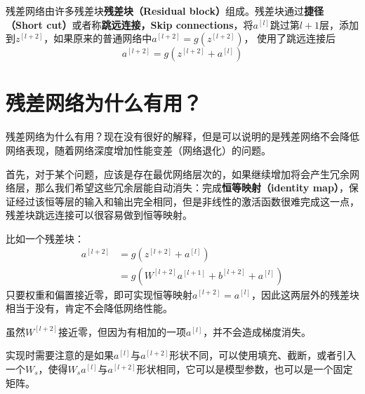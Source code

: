 \documentclass[../../main.tex]{subfiles}
\begin{document}
\begin{refsection}
\begin{figure}[H]
    \centering
\end{figure}

残差网络由许多残差块\textbf{残差块（Residual block）}组成。残差块通过\textbf{捷径（Short cut）}或者称\textbf{跳远连接，Skip connections}，将\(a^{[l]}\)跳过第\(l+1\)层，添加到\(z^{[l+2]}\)，如果原来的普通网络中\(
a^{[l+2]} = g(z^{[l+2]})
\)，
使用了跳远连接后\[
    a^{[l+2]} = g(z^{[l+2]} + a^{[l]})
\]

\section{残差网络为什么有用？}
残差网络为什么有用？现在没有很好的解释，但是可以说明的是残差网络不会降低网络表现，随着网络深度增加性能变差（网络退化）的问题。

首先，对于某个问题，应该是存在最优网络层次的，如果继续增加将会产生冗余网络层，那么我们希望这些冗余层能自动消失：完成\textbf{恒等映射（identity map）}，保证经过该恒等层的输入和输出完全相同，但是非线性的激活函数很难完成这一点，残差块跳远连接可以很容易做到恒等映射。

比如一个残差块：
\begin{align*}
    a^{[l+2]} & = g(z^{[l+2]}+a^{[l]})                    \\
              & = g(W^{[l+2]}a^{[l+1]}+b^{[l+2]}+a^{[l]})
\end{align*}
只要权重和偏置接近零，即可实现恒等映射\(a^{[l+2]} = a^{[l]}\)，因此这两层外的残差块相当于没有，肯定不会降低网络性能。

\begin{remark}
    虽然\(W^{[l+2]}\)接近零，但因为有相加的一项\(a^{[l]}\)，并不会造成梯度消失。
\end{remark}

实现时需要注意的是如果\(a^{[l]}\)与\(a^{[l+2]}\)形状不同，可以使用填充、截断，或者引入一个\(W_s\)，使得\(W_sa^{[l]}\)与\(a^{[l+2]}\)形状相同，它可以是模型参数，也可以是一个固定矩阵。


\end{refsection}
\end{document}
